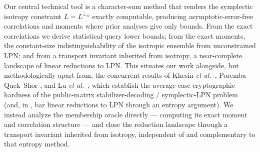 \documentclass[11pt,a4paper]{article}
\theoremstyle{plain}
\theoremstyle{definition}
\newcommand{\etal}{\textit{et al.}}
\begin{document}
Our central technical tool is a character-sum method that renders the symplectic isotropy constraint $L = L^{\perp_\Omega}$ exactly computable, producing asymptotic-error-free correlations and moments where prior analyses give only bounds. From the exact correlations we derive statistical-query lower bounds; from the exact moments, the constant-size indistinguishability of the isotropic ensemble from unconstrained LPN; and from a transport invariant inherited from isotropy, a near-complete landscape of linear reductions to LPN. This situates our work alongside, but methodologically apart from, the concurrent results of Khesin \etal\ \cite{KLP+25}, Poremba--Quek--Shor \cite{PQS26}, and Lu \etal\ \cite{LPQR26}, which establish the average-case cryptographic hardness of the public-matrix stabilizer-decoding / symplectic-LPN problem (and, in \cite{LPQR26}, bar linear reductions to LPN through an entropy argument). We instead analyze the membership oracle directly --- computing its exact moment and correlation structure --- and close the reduction landscape through a transport invariant inherited from isotropy, independent of and complementary to that entropy method.
\end{document}
